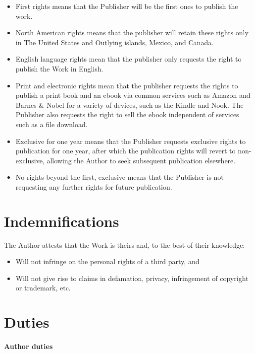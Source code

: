 \documentclass[12pt,letterpaper]{article}
\begin{document}
\begin{itemize}
    \item First rights means that the Publisher will be the first ones to publish the work.
    \item North American rights means that the publisher will retain these rights only in The United States and Outlying islands, Mexico, and Canada.
    \item English language rights mean that the publisher only requests the right to publish the Work in English.
    \item Print and electronic rights mean that the publisher requests the rights to publish a print book and an ebook via common services such as Amazon and Barnes \& Nobel for a variety of devices, such as the Kindle and Nook. The Publisher also requests the right to sell the ebook independent of services such as a file download.
    \item Exclusive for one year means that the Publisher requests exclusive rights to publication for one year, after which the publication rights will revert to non-exclusive, allowing the Author to seek subsequent publication elsewhere.
    \item No rights beyond the first, exclusive means that the Publisher is not requesting any further rights for future publication.
\end{itemize}

\section{Indemnifications}

The Author attests that the Work is theirs and, to the best of their knowledge:

\begin{itemize}
    \item Will not infringe on the personal rights of a third party, and
    \item Will not give rise to claims in defamation, privacy, infringement of copyright or trademark, etc.
\end{itemize}

\section{Duties}

\paragraph{Author duties}
\end{document}
